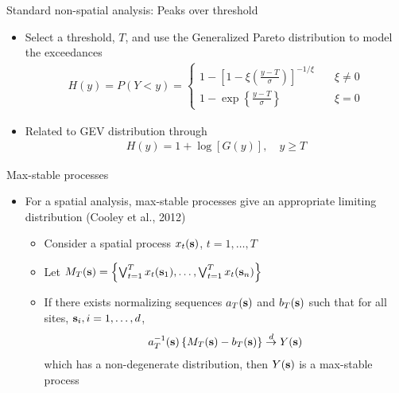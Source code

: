 \documentclass{beamer}
\begin{document}
\begin{frame}{Standard non-spatial analysis: Peaks over threshold}
  \begin{itemize}  \setlength{\itemsep}{0.5em}
    \item Select a threshold, $T$, and use the Generalized Pareto distribution to model the exceedances
    \begin{align*}
      H(y) = P(Y < y) = \left\{ \begin{array}{ll}
        1 - \left[1 - \xi \left( \frac{ y - T }{ \sigma } \right) \right]^{-1 / \xi} & \quad \xi \neq 0 \\[0.5em]
        1 - \exp \left\{ \frac{ y - T }{ \sigma} \right\} & \quad \xi = 0
      \end{array}\right.
    \end{align*}
    \item Related to GEV distribution through
    \begin{align*}
      H(y) = 1 + \log[G(y)], \quad y \ge T
    \end{align*}
  \end{itemize}
\end{frame}

\begin{frame}{Max-stable processes}
  \begin{itemize} \setlength{\itemsep}{0.5em}
    \item For a spatial analysis, max-stable processes give an appropriate limiting distribution (Cooley et al., 2012)
    \begin{itemize}
      \item Consider a spatial process $x_t(\mbox{\bf s})$, $t = 1, \ldots, T$
      \item Let $M_T(\mbox{\bf s}) = \left\{ \bigvee_{t=1}^T x_t(\mbox{\bf s}_1), \ldots, \bigvee_{t=1}^T x_t(\mbox{\bf s}_n) \right\}$
      \item If there exists normalizing sequences $a_T(\mbox{\bf s})$ and $b_T(\mbox{\bf s})$ such
      that for all sites, $\mbox{\bf s}_i, i = 1, \ldots, d$,
      \begin{align*}
        a_T^{-1}(\mbox{\bf s}) \left\{ M_T(\mbox{\bf s}) - b_T(\mbox{\bf s}) \right\} \stackrel{d}{\rightarrow} Y(\mbox{\bf s})
      \end{align*}
      which has a non-degenerate distribution, then $Y(\mbox{\bf s})$ is a max-stable process
    \end{itemize}
  \end{itemize}
\end{frame}
\end{document}
